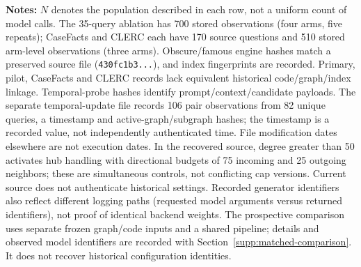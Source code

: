 \footnotesize\raggedright\textbf{Notes:} $N$ denotes the population described in each row, not a uniform count of model calls. The 35-query ablation has 700 stored observations (four arms, five repeats); CaseFacts and CLERC each have 170 source questions and 510 stored arm-level observations (three arms). Obscure/famous engine hashes match a preserved source file (\texttt{430fc1b3...}), and index fingerprints are recorded. Primary, pilot, CaseFacts and CLERC records lack equivalent historical code/graph/index linkage. Temporal-probe hashes identify prompt/context/candidate payloads. The separate temporal-update file records 106 pair observations from 82 unique queries, a timestamp and active-graph/subgraph hashes; the timestamp is a recorded value, not independently authenticated time. File modification dates elsewhere are not execution dates. In the recovered source, degree greater than 50 activates hub handling with directional budgets of 75 incoming and 25 outgoing neighbors; these are simultaneous controls, not conflicting cap versions. Current source does not authenticate historical settings. Recorded generator identifiers also reflect different logging paths (requested model arguments versus returned identifiers), not proof of identical backend weights. The prospective comparison uses separate frozen graph/code inputs and a shared pipeline; details and observed model identifiers are recorded with Section~\ref{supp:matched-comparison}. It does not recover historical configuration identities.
\par\endgroup
